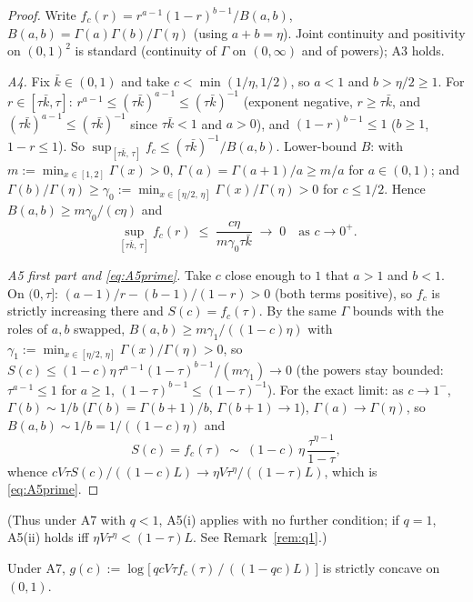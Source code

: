 \begin{proof}
Write $f_c(r) = r^{a-1}(1 - r)^{b-1}/B(a, b)$,
$B(a, b) = \Gamma(a)\Gamma(b)/\Gamma(\eta)$ (using $a + b = \eta$). Joint continuity
and positivity on $(0,1)^2$ is standard (continuity of $\Gamma$ on $(0,\infty)$ and of
powers); A3 holds.

\emph{A4.} Fix $\bar k \in (0,1)$ and take $c < \min(1/\eta, 1/2)$, so $a < 1$ and
$b > \eta/2 \ge 1$. For $r \in [\tau\bar k, \tau]$:
$r^{a-1} \le (\tau\bar k)^{a-1} \le (\tau\bar k)^{-1}$ (exponent negative,
$r \ge \tau\bar k$, and $(\tau\bar k)^{a-1} \le (\tau\bar k)^{-1}$ since
$\tau\bar k < 1$ and $a > 0$), and $(1 - r)^{b-1} \le 1$ ($b \ge 1$, $1 - r \le 1$). So
$\sup_{[\tau\bar k,\, \tau]} f_c \le (\tau\bar k)^{-1}/B(a, b)$. Lower-bound $B$: with
$m := \min_{x \in [1,2]} \Gamma(x) > 0$, $\Gamma(a) = \Gamma(a + 1)/a \ge m/a$ for
$a \in (0,1)$; and
$\Gamma(b)/\Gamma(\eta) \ge \gamma_0 := \min_{x \in [\eta/2,\, \eta]}
\Gamma(x)/\Gamma(\eta) > 0$ for $c \le 1/2$. Hence $B(a, b) \ge m\gamma_0/(c\eta)$ and
\[
\sup_{[\tau\bar k,\, \tau]} f_c(r)
\;\le\; \frac{c\eta}{m \gamma_0 \tau \bar k}
\;\to\; 0 \quad \text{as } c \to 0^+.
\]

\emph{A5 first part and \eqref{eq:A5prime}.} Take $c$ close enough to $1$ that $a > 1$
and $b < 1$. On $(0, \tau]$: $(a-1)/r - (b-1)/(1-r) > 0$ (both terms positive), so
$f_c$ is strictly increasing there and $S(c) = f_c(\tau)$. By the same $\Gamma$ bounds
with the roles of $a, b$ swapped, $B(a, b) \ge m\gamma_1/((1 - c)\eta)$ with
$\gamma_1 := \min_{x \in [\eta/2,\, \eta]} \Gamma(x)/\Gamma(\eta) > 0$, so
$S(c) \le (1 - c)\eta\, \tau^{a-1}(1 - \tau)^{b-1}/(m\gamma_1) \to 0$ (the powers stay
bounded: $\tau^{a-1} \le 1$ for $a \ge 1$, $(1 - \tau)^{b-1} \le (1 - \tau)^{-1}$). For
the exact limit: as $c \to 1^-$, $\Gamma(b) \sim 1/b$ ($\Gamma(b) = \Gamma(b + 1)/b$,
$\Gamma(b + 1) \to 1$), $\Gamma(a) \to \Gamma(\eta)$, so
$B(a, b) \sim 1/b = 1/((1 - c)\eta)$ and
\[
S(c) = f_c(\tau) \;\sim\; (1 - c)\,\eta\,\frac{\tau^{\eta - 1}}{1 - \tau},
\]
whence $cV\tau S(c)/((1 - c)L) \to \eta V \tau^{\eta}/((1 - \tau)L)$, which is
\eqref{eq:A5prime}.
\end{proof}

\noindent (Thus under A7 with $q < 1$, A5(i) applies with no further condition; if
$q = 1$, A5(ii) holds iff $\eta V \tau^{\eta} < (1 - \tau)L$. See
Remark~\ref{rem:q1}.)

\begin{lemma}
\label{lem:logconcave}
Under A7, $g(c) := \log\bigl[\, qcV\tau f_c(\tau) \,/\, ((1 - qc)L) \,\bigr]$ is
strictly concave on $(0,1)$.
\end{lemma}

